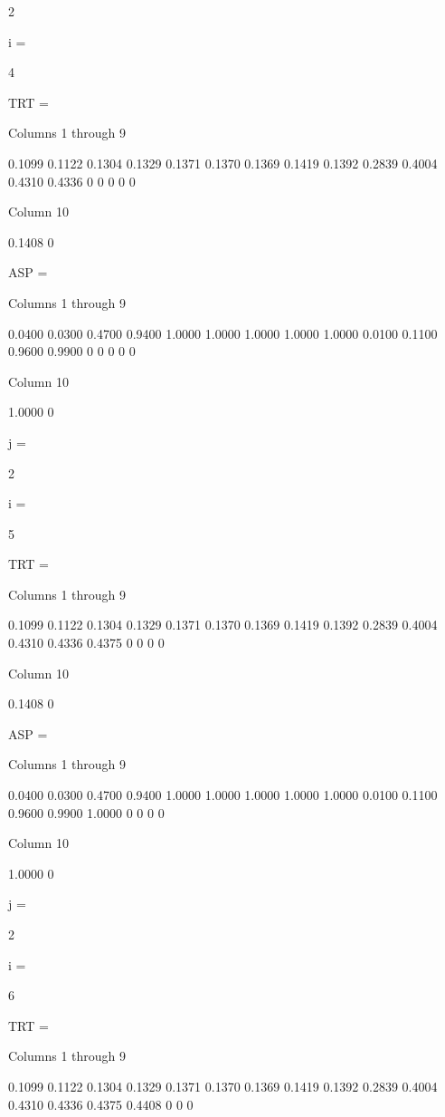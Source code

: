      2


i =

     4


TRT =

  Columns 1 through 9

    0.1099    0.1122    0.1304    0.1329    0.1371    0.1370    0.1369    0.1419    0.1392
    0.2839    0.4004    0.4310    0.4336         0         0         0         0         0

  Column 10

    0.1408
         0


ASP =

  Columns 1 through 9

    0.0400    0.0300    0.4700    0.9400    1.0000    1.0000    1.0000    1.0000    1.0000
    0.0100    0.1100    0.9600    0.9900         0         0         0         0         0

  Column 10

    1.0000
         0


j =

     2


i =

     5


TRT =

  Columns 1 through 9

    0.1099    0.1122    0.1304    0.1329    0.1371    0.1370    0.1369    0.1419    0.1392
    0.2839    0.4004    0.4310    0.4336    0.4375         0         0         0         0

  Column 10

    0.1408
         0


ASP =

  Columns 1 through 9

    0.0400    0.0300    0.4700    0.9400    1.0000    1.0000    1.0000    1.0000    1.0000
    0.0100    0.1100    0.9600    0.9900    1.0000         0         0         0         0

  Column 10

    1.0000
         0


j =

     2


i =

     6


TRT =

  Columns 1 through 9

    0.1099    0.1122    0.1304    0.1329    0.1371    0.1370    0.1369    0.1419    0.1392
    0.2839    0.4004    0.4310    0.4336    0.4375    0.4408         0         0         0

